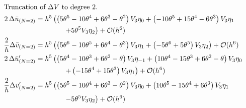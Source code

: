 \begin{align*}
    \intertext{Truncation of $\Delta V$ to degree $2$.}
    2\,\Delta \bar{u}_{(N=2)}          & = h^{5}\left(\left(5 \theta^{5} - 10 \theta^{4} + 6 \theta^{3} - \theta^{2}\right) V_{3} \eta_{0} + \left(-10 \theta^{5} + 15 \theta^{4} - 6 \theta^{3}\right) V_{3} \eta_{1} \right.      \\
                                       & \qquad\qquad \left.+5 \theta^{5} V_{3} \eta_{2}\right) + \mathcal{O}(h^{6})                                                                                                                \\
    \frac{2}{h}\Delta \bar{v}_{(N=2)}  & = h^{5}\left(\left(5 \theta^{6} - 10 \theta^{5} + 6 \theta^{4} - \theta^{3}\right) V_{3} \eta_{1} + \left(-5 \theta^{6} + 5 \theta^{5}\right) V_{3} \eta_{2}\right) + \mathcal{O}(h^{6})   \\
    2\,\Delta \bar{u}'_{(N=2)}         & = h^{5}\left(\left(5 \theta^{4} - 10 \theta^{3} + 6 \theta^{2} - \theta\right) V_{3} \eta_{-1} + \left(10 \theta^{4} - 15 \theta^{3} + 6 \theta^{2} - \theta\right) V_{3} \eta_{0} \right. \\
                                       & \qquad\qquad \left. + \left(-15 \theta^{4} + 15 \theta^{3}\right) V_{3} \eta_{1}\right) + \mathcal{O}(h^{6})                                                                               \\
    \frac{2}{h}\Delta \bar{v}'_{(N=2)} & = h^{5}\left(\left(5 \theta^{5} - 10 \theta^{4} + 6 \theta^{3} - \theta^{2}\right) V_{3} \eta_{0} + \left(10 \theta^{5} - 15 \theta^{4} + 6 \theta^{3}\right) V_{3} \eta_{1} \right.       \\
                                       & \qquad\qquad \left. -5 \theta^{5} V_{3} \eta_{2}\right) + \mathcal{O}(h^{6})
\end{align*}

%


